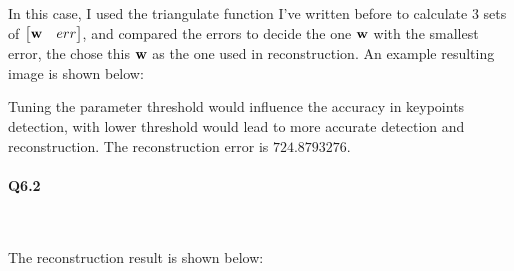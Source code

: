 \documentclass[11pt]{article} \usepackage{fullpage} \usepackage{graphicx} \usepackage{epstopdf} \usepackage{color} \usepackage{psfrag} \usepackage{pdfsync}\usepackage{indentfirst}\usepackage{subfigure}\usepackage{float}\usepackage[section]{placeins}
\begin{document}
In this case, I used the triangulate function I've written before to calculate $3$ sets of $\begin{bmatrix} \bold{w} & err \end{bmatrix}$, and compared the errors to decide the one $\bold{w}$ with the smallest error, the chose this $\bold{w}$ as the one used in reconstruction. An example resulting image is shown below:

Tuning the parameter threshold would influence the accuracy in keypoints detection, with lower threshold would lead to more accurate detection and reconstruction. The reconstruction error is $724.8793276$.

\paragraph{Q6.2}~{}

The reconstruction result is shown below:
\end{document}

